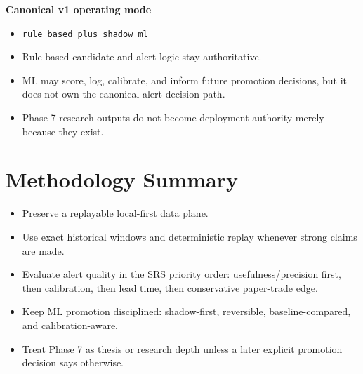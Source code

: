 \documentclass{article}
\begin{document}
\textbf{Canonical v1 operating mode}
\begin{itemize}
\item \texttt{rule\_based\_plus\_shadow\_ml}
\item Rule-based candidate and alert logic stay authoritative.
\item ML may score, log, calibrate, and inform future promotion decisions, but it does not own the canonical alert decision path.
\item Phase 7 research outputs do not become deployment authority merely because they exist.
\end{itemize}

\section*{Methodology Summary}
\begin{itemize}
\item Preserve a replayable local-first data plane.
\item Use exact historical windows and deterministic replay whenever strong claims are made.
\item Evaluate alert quality in the SRS priority order: usefulness/precision first, then calibration, then lead time, then conservative paper-trade edge.
\item Keep ML promotion disciplined: shadow-first, reversible, baseline-compared, and calibration-aware.
\item Treat Phase 7 as thesis or research depth unless a later explicit promotion decision says otherwise.
\end{itemize}
\end{document}
